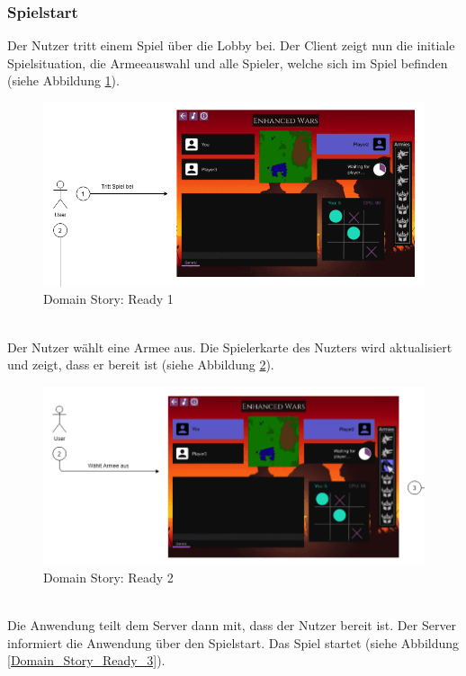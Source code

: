 \documentclass[12pt, titlepage]{scrartcl}
\begin{document}
		    \subsubsection{Spielstart}
		    	Der Nutzer tritt einem Spiel \"uber die Lobby bei. Der Client zeigt nun die initiale Spielsituation, die Armeeauswahl und alle Spieler, welche sich im Spiel befinden (siehe Abbildung \ref{Domain_Story_Ready_1}).
			    \begin{figure}[H] 
			    	\centering
			    	\includegraphics[width=\textwidth]{images/domain_stories/readyStory1.png}
			    	\caption{Domain Story: Ready 1}
			    	\label{Domain_Story_Ready_1}
			    \end{figure}
				\ \\ Der Nutzer w\"ahlt eine Armee aus. Die Spielerkarte des Nuzters wird aktualisiert und zeigt, dass er bereit ist (siehe Abbildung \ref{Domain_Story_Ready_2}).
			    \begin{figure}[H] 
			    	\centering
			    	\includegraphics[width=\textwidth]{images/domain_stories/readyStory2.png}
			    	\caption{Domain Story: Ready 2}
			    	\label{Domain_Story_Ready_2}
			    \end{figure}
				\ \\ Die Anwendung teilt dem Server dann mit, dass der Nutzer bereit ist. Der Server informiert die Anwendung \"uber den Spielstart. Das Spiel startet (siehe Abbildung \ref{Domain_Story_Ready_3}).
\end{document}

